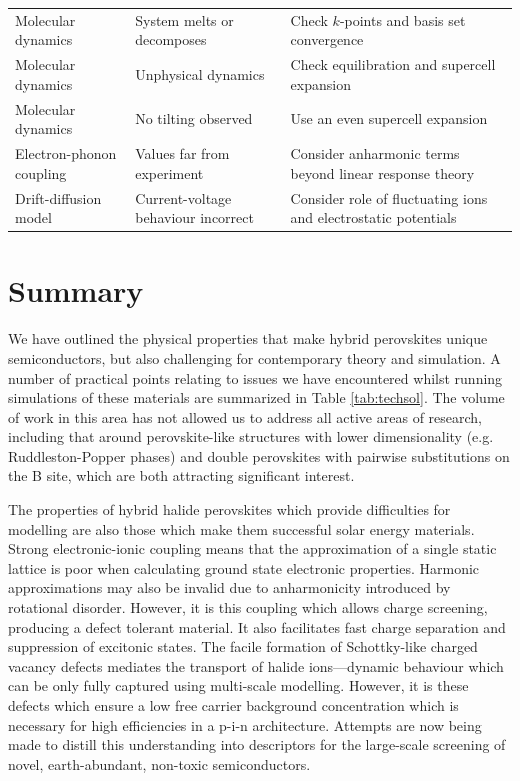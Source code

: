 \begin{table}
\begin{tabular}{p{4cm}p{4cm}p{6cm}}
Molecular dynamics & System melts or decomposes & Check $k$-points and basis set convergence \\
Molecular dynamics & Unphysical dynamics & Check equilibration and supercell expansion \\
Molecular dynamics & No tilting observed & Use an even supercell expansion \\
Electron-phonon coupling & Values far from experiment & Consider anharmonic terms beyond linear response theory   \\
Drift-diffusion model & Current-voltage behaviour incorrect & Consider role of fluctuating ions and electrostatic potentials \\
\bottomrule
\end{tabular}

\end{table}

\section{Summary}

We have outlined the physical properties that make hybrid perovskites unique semiconductors, but also challenging for contemporary theory and simulation. 
A number of practical points relating to issues we have encountered whilst running simulations of these materials are summarized in Table \ref{tab:techsol}.
%
The volume of work in this area has not allowed us to address all active areas of research, including that around perovskite-like structures with lower dimensionality (e.g. Ruddleston-Popper phases)\autocite{Tsai2016,Saparov2016b,Ganose2015} and double perovskites with pairwise substitutions on the B site,\autocite{Savory2016,McClure2016a,Wei2016a,Volonakis2016} 
which are both attracting significant interest. 

The properties of hybrid halide perovskites which provide difficulties for modelling are also those which make them successful solar energy materials.
Strong electronic-ionic coupling means that the approximation of a single static lattice is poor when calculating ground state electronic properties. Harmonic approximations may also be invalid due to anharmonicity introduced by rotational disorder. However, it is this coupling which allows charge screening, producing a defect tolerant material. 
It also facilitates fast charge separation and suppression of excitonic states.
The facile formation of Schottky-like charged vacancy defects mediates the transport of halide ions---dynamic behaviour which can be only fully captured using multi-scale modelling. However, it is these defects which ensure a low free carrier background concentration which is necessary for high efficiencies in a p-i-n architecture.
Attempts are now being made to distill this understanding into descriptors for the large-scale screening of novel, earth-abundant, non-toxic semiconductors.\autocite{Brandt2015a,Ganose2016}

